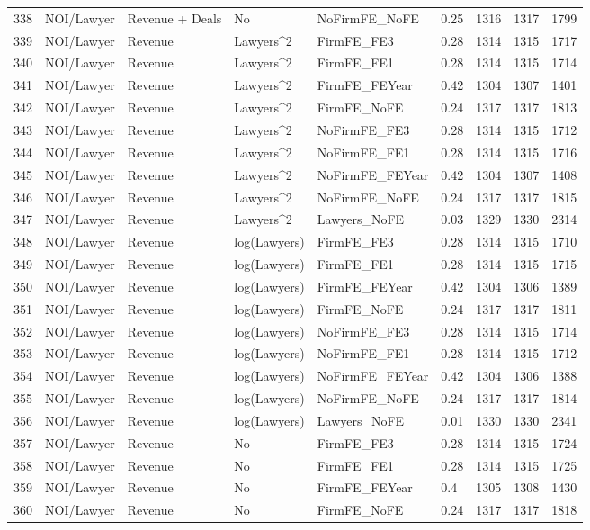 \begin{table}[ht]
\begin{tabular}{rllllllll}
  338 & NOI/Lawyer & Revenue + Deals & No & NoFirmFE\_NoFE & 0.25 & 1316 & 1317 & 1799 \\ 
  339 & NOI/Lawyer & Revenue & Lawyers^2 & FirmFE\_FE3 & 0.28 & 1314 & 1315 & 1717 \\ 
  340 & NOI/Lawyer & Revenue & Lawyers^2 & FirmFE\_FE1 & 0.28 & 1314 & 1315 & 1714 \\ 
  341 & NOI/Lawyer & Revenue & Lawyers^2 & FirmFE\_FEYear & 0.42 & 1304 & 1307 & 1401 \\ 
  342 & NOI/Lawyer & Revenue & Lawyers^2 & FirmFE\_NoFE & 0.24 & 1317 & 1317 & 1813 \\ 
  343 & NOI/Lawyer & Revenue & Lawyers^2 & NoFirmFE\_FE3 & 0.28 & 1314 & 1315 & 1712 \\ 
  344 & NOI/Lawyer & Revenue & Lawyers^2 & NoFirmFE\_FE1 & 0.28 & 1314 & 1315 & 1716 \\ 
  345 & NOI/Lawyer & Revenue & Lawyers^2 & NoFirmFE\_FEYear & 0.42 & 1304 & 1307 & 1408 \\ 
  346 & NOI/Lawyer & Revenue & Lawyers^2 & NoFirmFE\_NoFE & 0.24 & 1317 & 1317 & 1815 \\ 
  347 & NOI/Lawyer & Revenue & Lawyers^2 & Lawyers\_NoFE & 0.03 & 1329 & 1330 & 2314 \\ 
  348 & NOI/Lawyer & Revenue & log(Lawyers) & FirmFE\_FE3 & 0.28 & 1314 & 1315 & 1710 \\ 
  349 & NOI/Lawyer & Revenue & log(Lawyers) & FirmFE\_FE1 & 0.28 & 1314 & 1315 & 1715 \\ 
  350 & NOI/Lawyer & Revenue & log(Lawyers) & FirmFE\_FEYear & 0.42 & 1304 & 1306 & 1389 \\ 
  351 & NOI/Lawyer & Revenue & log(Lawyers) & FirmFE\_NoFE & 0.24 & 1317 & 1317 & 1811 \\ 
  352 & NOI/Lawyer & Revenue & log(Lawyers) & NoFirmFE\_FE3 & 0.28 & 1314 & 1315 & 1714 \\ 
  353 & NOI/Lawyer & Revenue & log(Lawyers) & NoFirmFE\_FE1 & 0.28 & 1314 & 1315 & 1712 \\ 
  354 & NOI/Lawyer & Revenue & log(Lawyers) & NoFirmFE\_FEYear & 0.42 & 1304 & 1306 & 1388 \\ 
  355 & NOI/Lawyer & Revenue & log(Lawyers) & NoFirmFE\_NoFE & 0.24 & 1317 & 1317 & 1814 \\ 
  356 & NOI/Lawyer & Revenue & log(Lawyers) & Lawyers\_NoFE & 0.01 & 1330 & 1330 & 2341 \\ 
  357 & NOI/Lawyer & Revenue & No & FirmFE\_FE3 & 0.28 & 1314 & 1315 & 1724 \\ 
  358 & NOI/Lawyer & Revenue & No & FirmFE\_FE1 & 0.28 & 1314 & 1315 & 1725 \\ 
  359 & NOI/Lawyer & Revenue & No & FirmFE\_FEYear & 0.4 & 1305 & 1308 & 1430 \\ 
  360 & NOI/Lawyer & Revenue & No & FirmFE\_NoFE & 0.24 & 1317 & 1317 & 1818 \\ 
   \hline
\end{tabular}
\end{table}
